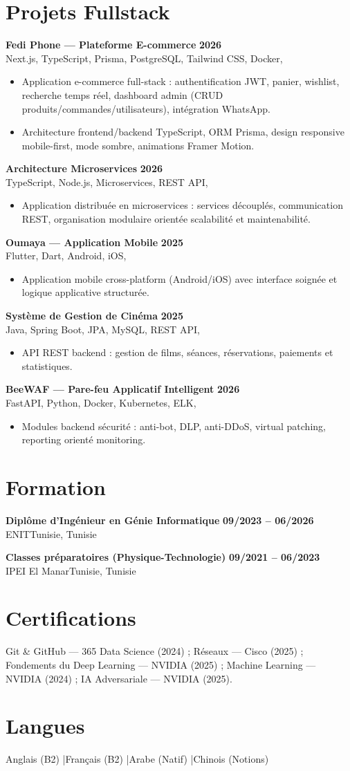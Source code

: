 \documentclass[a4paper,10pt]{article}
\newcommand{\cventry}[4]{\textbf{#1} \hfill \textbf{#4}\\[1pt]#2{\ifx\relax#3\relax\else, #3\fi}\par\vspace{1pt}}
\begin{document}
\section{Projets Fullstack}
\cventry{Fedi Phone — Plateforme E-commerce}{Next.js, TypeScript, Prisma, PostgreSQL, Tailwind CSS, Docker}{}{2026}
\begin{itemize}
  \item Application e-commerce full-stack : authentification JWT, panier, wishlist, recherche temps réel, dashboard admin (CRUD produits/commandes/utilisateurs), intégration WhatsApp.
  \item Architecture frontend/backend TypeScript, ORM Prisma, design responsive mobile-first, mode sombre, animations Framer Motion.
\end{itemize}
\cventry{Architecture Microservices}{TypeScript, Node.js, Microservices, REST API}{}{2026}
\begin{itemize}
  \item Application distribuée en microservices : services découplés, communication REST, organisation modulaire orientée scalabilité et maintenabilité.
\end{itemize}
\cventry{Oumaya — Application Mobile}{Flutter, Dart, Android, iOS}{}{2025}
\begin{itemize}
  \item Application mobile cross-platform (Android/iOS) avec interface soignée et logique applicative structurée.
\end{itemize}
\cventry{Système de Gestion de Cinéma}{Java, Spring Boot, JPA, MySQL, REST API}{}{2025}
\begin{itemize}
  \item API REST backend : gestion de films, séances, réservations, paiements et statistiques.
\end{itemize}
\cventry{BeeWAF — Pare-feu Applicatif Intelligent}{FastAPI, Python, Docker, Kubernetes, ELK}{}{2026}
\begin{itemize}
  \item Modules backend sécurité : anti-bot, DLP, anti-DDoS, virtual patching, reporting orienté monitoring.
\end{itemize}
\section{Formation}
\cventry{Diplôme d'Ingénieur en Génie Informatique}{ENIT}{Tunisie}{09/2023 -- 06/2026}
\cventry{Classes préparatoires (Physique-Technologie)}{IPEI El Manar}{Tunisie}{09/2021 -- 06/2023}
\section{Certifications}
Git \& GitHub --- 365 Data Science (2024) ; Réseaux --- Cisco (2025) ; Fondements du Deep Learning --- NVIDIA (2025) ; Machine Learning --- NVIDIA (2024) ; IA Adversariale --- NVIDIA (2025).
\section{Langues}
Anglais (B2) \quad|\quad Français (B2) \quad|\quad Arabe (Natif) \quad|\quad Chinois (Notions)
\end{document}
